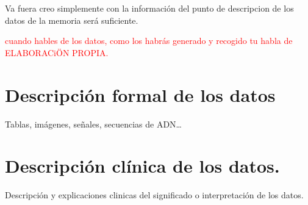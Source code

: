 
Va fuera creo simplemente con la información del punto de descripcion de los datos de la memoria será suficiente.

\textcolor{red}{cuando hables de los datos, como los habrás generado y recogido tu habla de ELABORACiÖN PROPIA.}

\section{Descripción formal de los datos}

Tablas, imágenes, señales, secuencias de ADN…
    
\section{Descripción clínica de los datos.}

Descripción y explicaciones clinicas del significado o interpretación de los datos.